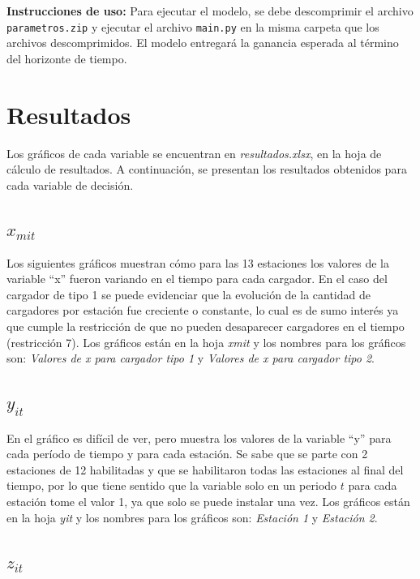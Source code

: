 \documentclass[letterpaper]{article}
\begin{document}
\begin{flushleft}
	\textbf{Instrucciones de uso:} Para ejecutar el modelo, se debe descomprimir el archivo \texttt{parametros.zip} y ejecutar el archivo \texttt{main.py} en la misma carpeta que los archivos descomprimidos. El modelo entregará la ganancia esperada al término del horizonte de tiempo.

	\section{Resultados}

	Los gráficos de cada variable se encuentran en \textit{resultados.xlsx}, en la hoja de cálculo de resultados. A continuación, se presentan los resultados obtenidos para cada variable de decisión.

	\subsection{$x_{mit}$}

	Los siguientes gráficos muestran cómo para las 13 estaciones los valores de la variable “x” fueron variando en el tiempo para cada cargador. En el caso del cargador de tipo 1 se puede evidenciar que la evolución de la cantidad de cargadores por estación fue creciente o constante, lo cual es de sumo interés ya que cumple la restricción de que no pueden desaparecer cargadores en el tiempo (restricción 7). Los gráficos están en la hoja \textit{xmit} y los nombres para los gráficos son: \textit{Valores de x para cargador tipo 1} y \textit{Valores de x para cargador tipo 2}.

	\subsection{$y_{it}$}

	En el gráfico es difícil de ver, pero muestra los valores de la variable “y” para cada período de tiempo y para cada estación. Se sabe que se parte con 2 estaciones de 12 habilitadas y que se habilitaron todas las estaciones al final del tiempo, por lo que tiene sentido que la variable solo en un periodo $t$ para cada estación tome el valor 1, ya que solo se puede instalar una vez. Los gráficos están en la hoja \textit{yit} y los nombres para los gráficos son: \textit{Estación 1} y \textit{Estación 2}.

	\subsection{$z_{it}$}


\end{flushleft}
\end{document}
